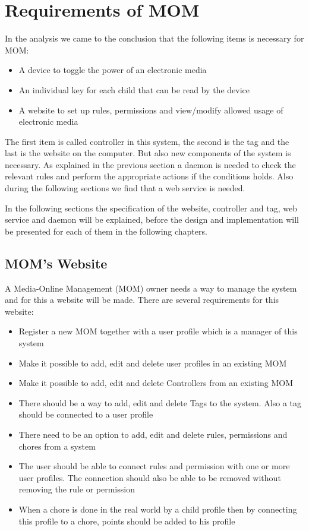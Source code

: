 \section{Requirements of MOM}
\label{sec:RequirMOM}

In the analysis we came to the conclusion that the following items is necessary for MOM: 
\begin{itemize}
	\item A device to toggle the power of an electronic media
	\item An individual key for each child that can be read by the device
	\item A website to set up rules, permissions and view/modify allowed usage of electronic media
\end{itemize} 


The first item is called controller in this system, the second is the tag and the last is the website on the computer. But also new components of the system is necessary. As explained in the previous section a daemon is needed to check the relevant rules and perform the appropriate actions if the conditions holds. Also during the following sections we find that a web service is needed. 

In the following sections the specification of the website, controller and tag, web service and daemon will be explained, before the design and implementation will be presented for each of them in the following chapters.  

\subsection{MOM's Website}
\label{subsection:momswebsite}
A Media-Online Management (MOM) owner needs a way to manage the system and for this a website will be made. There are several requirements for this website:

\begin{itemize}
	\item Register a new MOM together with a user profile which is a manager of this system
	\item Make it possible to add, edit and delete user profiles in an existing MOM 
	\item Make it possible to add, edit and delete Controllers from an existing MOM
	\item There should be a way to add, edit and delete Tags to the system. Also a tag should be connected to a user profile
	\item There need to be an option to add, edit and delete rules, permissions and chores from a system
	\item The user should be able to connect rules and permission with one or more user profiles. The connection should also be able to be removed without removing the rule or permission
	\item When a chore is done in the real world by a child profile then by connecting this profile to a chore, points should be added to his profile
\end{itemize}


